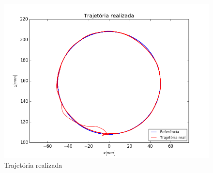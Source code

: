 \documentclass[]{politex}
\begin{document}
\begin{figure}[H]
	\centering
	\includegraphics[scale=0.39]{../../../Experimental/Aquisicoes/CTCt_circulo/xy.png}  
	\caption{Trajetória realizada}
	\label{fig:CTCq_circulo_xy}
\end{figure}
\end{document}
